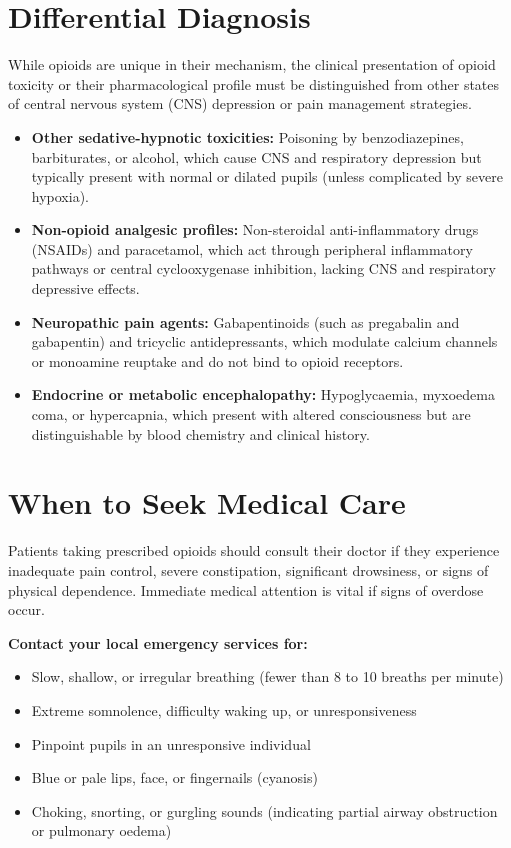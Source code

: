 \section*{Differential Diagnosis}
While opioids are unique in their mechanism, the clinical presentation of opioid toxicity or their pharmacological profile must be distinguished from other states of central nervous system (CNS) depression or pain management strategies.
\begin{itemize}
    \item \textbf{Other sedative-hypnotic toxicities:} Poisoning by benzodiazepines, barbiturates, or alcohol, which cause CNS and respiratory depression but typically present with normal or dilated pupils (unless complicated by severe hypoxia).
    \item \textbf{Non-opioid analgesic profiles:} Non-steroidal anti-inflammatory drugs (NSAIDs) and paracetamol, which act through peripheral inflammatory pathways or central cyclooxygenase inhibition, lacking CNS and respiratory depressive effects.
    \item \textbf{Neuropathic pain agents:} Gabapentinoids (such as pregabalin and gabapentin) and tricyclic antidepressants, which modulate calcium channels or monoamine reuptake and do not bind to opioid receptors.
    \item \textbf{Endocrine or metabolic encephalopathy:} Hypoglycaemia, myxoedema coma, or hypercapnia, which present with altered consciousness but are distinguishable by blood chemistry and clinical history.
\end{itemize}

\section*{When to Seek Medical Care}
Patients taking prescribed opioids should consult their doctor if they experience inadequate pain control, severe constipation, significant drowsiness, or signs of physical dependence. Immediate medical attention is vital if signs of overdose occur.

\textbf{Contact your local emergency services for:}
\begin{itemize}
    \item Slow, shallow, or irregular breathing (fewer than 8 to 10 breaths per minute)
    \item Extreme somnolence, difficulty waking up, or unresponsiveness
    \item Pinpoint pupils in an unresponsive individual
    \item Blue or pale lips, face, or fingernails (cyanosis)
    \item Choking, snorting, or gurgling sounds (indicating partial airway obstruction or pulmonary oedema)
\end{itemize}

